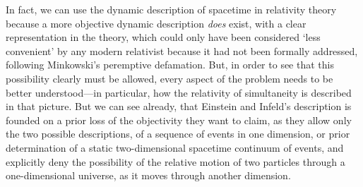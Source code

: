In fact, we can use the dynamic description of spacetime in relativity theory because a more objective dynamic description \textit{does} exist, with a clear representation in the theory, which could only have been considered `less convenient' by any modern relativist because it had not been formally addressed, following Minkowski's peremptive defamation. But, in order to see that this possibility clearly must be allowed, every aspect of the problem needs to be better understood---in particular, how the relativity of simultaneity is described in that picture. But we can see already, that Einstein and Infeld's description is founded on a prior loss of the objectivity they want to claim, as they allow only the two possible descriptions, of a sequence of events in one dimension, or prior determination of a static two-dimensional spacetime continuum of events, and explicitly deny the possibility of the relative motion of two particles through a one-dimensional universe, as it moves through another dimension.

